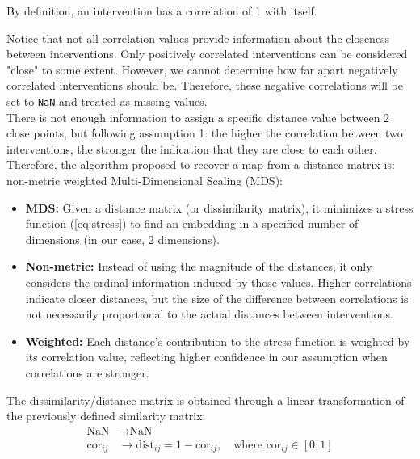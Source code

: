 \begin{remark}
    By definition, an intervention has a correlation of 1 with itself.
\end{remark}

Notice that not all correlation values provide information about the closeness between interventions. Only positively correlated interventions can be considered "close" to some extent. However, we cannot determine how far apart negatively correlated interventions should be. Therefore, these negative correlations will be set to \texttt{NaN} and treated as missing values.\\

There is not enough information to assign a specific distance value between 2 close points, but following assumption 1: the higher the correlation between two interventions, the stronger the indication that they are close to each other. Therefore, the algorithm proposed to recover a map from a distance matrix is: non-metric weighted Multi-Dimensional Scaling (MDS):

\begin{itemize}
    \item \textbf{MDS:} Given a distance matrix (or dissimilarity matrix), it minimizes a stress function (\ref{eq:stress}) to find an embedding in a specified number of dimensions (in our case, 2 dimensions).
    \item \textbf{Non-metric:} Instead of using the magnitude of the distances, it only considers the ordinal information induced by those values. Higher correlations indicate closer distances, but the size of the difference between correlations is not necessarily proportional to the actual distances between interventions.
    \item \textbf{Weighted:} Each distance's contribution to the stress function is weighted by its correlation value, reflecting higher confidence in our assumption when correlations are stronger.
\end{itemize}

\begin{remark}
    The dissimilarity/distance matrix is obtained through a linear transformation of the previously defined similarity matrix:
    \begin{align*}
        \text{NaN} &\rightarrow \text{NaN} \\
        \text{cor}_{ij} &\rightarrow \text{dist}_{ij} = 1-\text{cor}_{ij}, \quad \text{where } \text{cor}_{ij} \in [0,1]
    \end{align*}
\end{remark}


